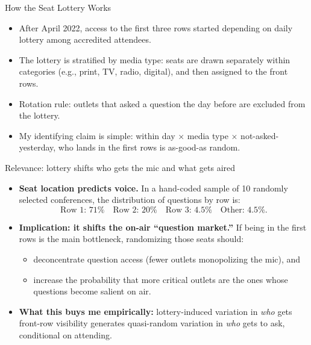 \documentclass[10pt,aspectratio=169]{beamer}
\begin{document}
\begin{frame}{How the Seat Lottery Works}
\begin{itemize}
  \setlength\itemsep{0.8em}

  \item After April 2022, access to the \alert{first three rows} started depending on \alert{daily lottery} among accredited attendees.

  \item The lottery is \alert{stratified by media type}: seats are drawn separately within categories (e.g., print, TV, radio, digital), and then assigned to the front rows.

  \item Rotation rule: outlets that asked a question the day before are excluded from the lottery.

  \item My identifying claim is simple: \alert{within day $\times$ media type $\times$ not-asked-yesterday}, who lands in the first rows is as-good-as random.
\end{itemize}
\end{frame}

\begin{frame}{Relevance: lottery shifts who gets the mic and what gets aired}
\small
\begin{itemize}\setlength\itemsep{0.65em}

  \item \textbf{Seat location predicts voice.}
  In a hand-coded sample of 10 randomly selected conferences, the distribution of questions by row is:
  \[
  \text{Row 1: }71\% \quad\text{Row 2: }20\% \quad\text{Row 3: }4.5\% \quad\text{Other: }4.5\%.
  \]

  \item \textbf{Implication: it shifts the on-air ``question market.''}
  If being in the first rows is the main bottleneck, randomizing those seats should:
  \begin{itemize}\setlength\itemsep{0.35em}
    \item \alert{deconcentrate} question access (fewer outlets monopolizing the mic), and
    \item increase the probability that \alert{more critical outlets} are the ones whose questions become salient on air.
  \end{itemize}

  \item \textbf{What this buys me empirically:}
  lottery-induced variation in \emph{who} gets front-row visibility generates quasi-random variation in \emph{who} gets to ask, conditional on attending.

\end{itemize}
\end{frame}
\end{document}
